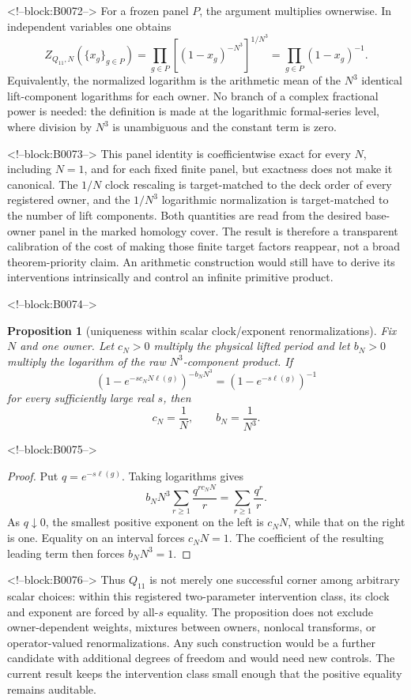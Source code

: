 \documentclass[11pt]{article}
\newtheorem{proposition}[theorem]{Proposition}
\theoremstyle{definition}
\theoremstyle{remark}
\begin{document}
<!--block:B0072-->
For a frozen panel $P$, the argument multiplies ownerwise. In independent variables one obtains
\[
Z_{Q_{11},N}(\{x_g\}_{g\in P})
=\prod_{g\in P}\left[(1-x_g)^{-N^3}\right]^{1/N^3}
=\prod_{g\in P}(1-x_g)^{-1}.
\]
Equivalently, the normalized logarithm is the arithmetic mean of the $N^3$ identical lift-component logarithms for each owner. No branch of a complex fractional power is needed: the definition is made at the logarithmic formal-series level, where division by $N^3$ is unambiguous and the constant term is zero.

<!--block:B0073-->
This panel identity is coefficientwise exact for every $N$, including $N=1$, and for each fixed finite panel, but exactness does not make it canonical. The $1/N$ clock rescaling is target-matched to the deck order of every registered owner, and the $1/N^3$ logarithmic normalization is target-matched to the number of lift components. Both quantities are read from the desired base-owner panel in the marked homology cover. The result is therefore a transparent calibration of the cost of making those finite target factors reappear, not a broad theorem-priority claim. An arithmetic construction would still have to derive its interventions intrinsically and control an infinite primitive product.

<!--block:B0074-->
\begin{proposition}[uniqueness within scalar clock/exponent renormalizations]\label{prop:unique-renorm}
Fix $N$ and one owner. Let $c_N>0$ multiply the physical lifted period and let $b_N>0$ multiply the logarithm of the raw $N^3$-component product. If
\[
\left(1-e^{-s c_NN\ell(g)}\right)^{-b_NN^3}
=\left(1-e^{-s\ell(g)}\right)^{-1}
\]
for every sufficiently large real $s$, then
\[
c_N=\frac1N,
\qquad
b_N=\frac1{N^3}.
\]
\end{proposition}

<!--block:B0075-->
\begin{proof}
Put $q=e^{-s\ell(g)}$. Taking logarithms gives
\[
b_NN^3\sum_{r\geq1}\frac{q^{r c_NN}}r
=\sum_{r\geq1}\frac{q^r}r.
\]
As $q\downarrow0$, the smallest positive exponent on the left is $c_NN$, while that on the right is one. Equality on an interval forces $c_NN=1$. The coefficient of the resulting leading term then forces $b_NN^3=1$.
\end{proof}

<!--block:B0076-->
Thus $Q_{11}$ is not merely one successful corner among arbitrary scalar choices: within this registered two-parameter intervention class, its clock and exponent are forced by all-$s$ equality. The proposition does not exclude owner-dependent weights, mixtures between owners, nonlocal transforms, or operator-valued renormalizations. Any such construction would be a further candidate with additional degrees of freedom and would need new controls. The current result keeps the intervention class small enough that the positive equality remains auditable.
\end{document}
